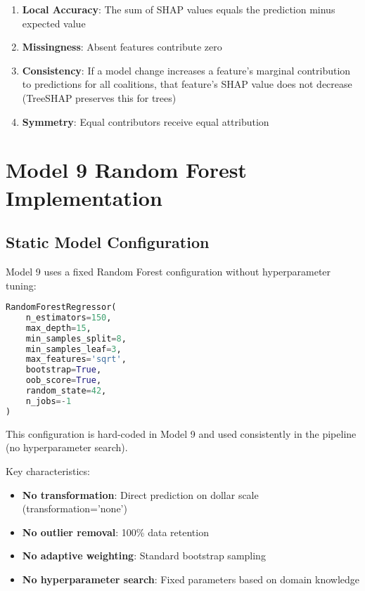 \begin{enumerate}
    \item \textbf{Local Accuracy}: The sum of SHAP values equals the prediction minus expected value
    \item \textbf{Missingness}: Absent features contribute zero
    \item \textbf{Consistency}: If a model change increases a feature's marginal contribution to predictions for all coalitions, that feature's SHAP value does not decrease (TreeSHAP preserves this for trees)
    \item \textbf{Symmetry}: Equal contributors receive equal attribution
\end{enumerate}

\section{Model 9 Random Forest Implementation}

\subsection{Static Model Configuration}
Model 9 uses a fixed Random Forest configuration without hyperparameter tuning:

\begin{lstlisting}[language=Python, caption=Model 9 Static Configuration (from code)]
RandomForestRegressor(
    n_estimators=150,
    max_depth=15,
    min_samples_split=8,
    min_samples_leaf=3,
    max_features='sqrt',
    bootstrap=True,
    oob_score=True,
    random_state=42,
    n_jobs=-1
)
\end{lstlisting}
This configuration is hard-coded in Model 9 and used consistently in the pipeline (no hyperparameter search). 

Key characteristics:
\begin{itemize}
    \item \textbf{No transformation}: Direct prediction on dollar scale (transformation='none')
    \item \textbf{No outlier removal}: 100\% data retention
    \item \textbf{No adaptive weighting}: Standard bootstrap sampling
    \item \textbf{No hyperparameter search}: Fixed parameters based on domain knowledge
\end{itemize}

